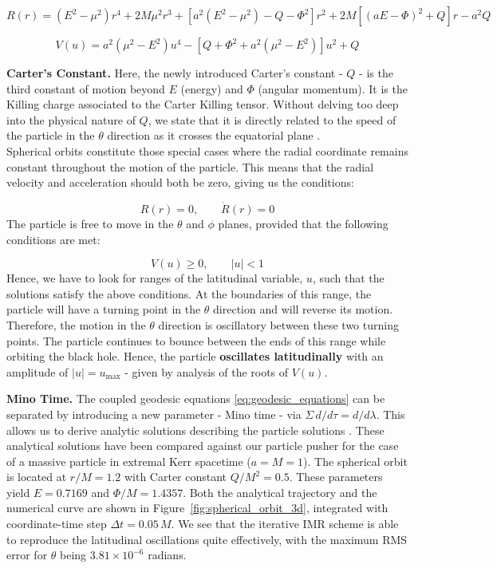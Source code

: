 \documentclass{article}
\begin{document}
\begin{equation} \label{eq:radial_potential}
    R(r) = (E^2 - \mu^2)r^4 + 2M\mu^2r^3 + [a^2(E^2 - \mu^2) - Q - \Phi^2]r^2 + 2M[(aE - \Phi)^2 + Q]r - a^2Q
\end{equation}

\begin{equation} \label{eq:theta_potential}
    V(u) = a^2(\mu^2 - E^2)u^4 - [Q + \Phi^2 + a^2(\mu^2 - E^2)]u^2 + Q
\end{equation}

\textbf{Carter's Constant.} Here, the newly introduced Carter's constant - $Q$ - is the third constant of motion beyond $E$ (energy) and $\Phi$ (angular momentum).
It is the Killing charge associated to the Carter Killing tensor.
Without delving too deep into the physical nature of $Q$, we state that it is directly related to the speed of the particle in the $\theta$ direction as it crosses the equatorial plane \cite{teoPhotonSpherical}.\\
Spherical orbits constitute those special cases where the radial coordinate remains constant throughout the motion of the particle. This means that the radial velocity and acceleration should both be zero, giving us the conditions:

\begin{equation}
    R(r) =0, \qquad \dot{R}(r) =0
    \label{eq:r_condition}
\end{equation}
The particle is free to move in the $\theta$ and $\phi$ planes, provided that the following conditions are met:

\begin{equation}
    V(u) \geq 0, \qquad |u| < 1
    \label{eq:u_condition}
\end{equation}
Hence, we have to look for ranges of the latitudinal variable, $u$, such that the solutions satisfy the above conditions. At the boundaries of this range, the particle will have a turning point in the $\theta$ direction and will reverse its motion. Therefore, the motion in the $\theta$ direction is oscillatory between these two turning points. The particle continues to bounce between the ends of this range while orbiting the black hole. Hence, the particle \textbf{oscillates latitudinally} with an amplitude of $|u|=u_{\mathrm{max}}$ - given by analysis of the roots of $V(u)$.

\textbf{Mino Time.} The coupled geodesic equations \eqref{eq:geodesic_equations} can be separated by introducing a new parameter - Mino time - via $\Sigma\,d/d\tau = d/d\lambda$. This allows us to derive analytic solutions describing the particle solutions \cite{teoTimelikeSpherical}. These analytical solutions have been compared against our particle pusher for the case of a massive particle in extremal Kerr spacetime ($a=M=1$). The spherical orbit is located at $r/M=1.2$ with Carter constant $Q/M^2=0.5$. These parameters yield $E=0.7169$ and $\Phi/M=1.4357$. Both the analytical trajectory and the numerical curve are shown in Figure~\ref{fig:spherical_orbit_3d}, integrated with coordinate-time step $\Delta t = 0.05\,M$. We see that the iterative IMR scheme is able to reproduce the latitudinal oscillations quite effectively, with the maximum RMS error for $\theta$ being $3.81\times 10^{-6}$ radians.
\end{document}
